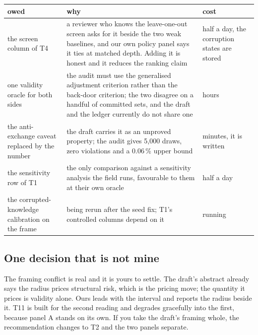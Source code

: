\begin{center}\footnotesize
\begin{tabular}{@{}p{5.0cm}p{8.4cm}p{2.5cm}@{}}
\toprule
owed & why & cost \\
\midrule
the screen column of T4 & a reviewer who knows the leave-one-out screen asks for it beside the two
weak baselines, and our own policy panel says it ties at matched depth. Adding it is honest and it
reduces the ranking claim & half a day, the corruption states are stored \\
\addlinespace
one validity oracle for both sides & the audit must use the generalised adjustment criterion rather
than the back-door criterion; the two disagree on a handful of committed sets, and the draft and
the ledger currently do not share one & hours \\
\addlinespace
the anti-exchange caveat replaced by the number & the draft carries it as an unproved property; the
audit gives 5{,}000 draws, zero violations and a 0.06\,\% upper bound & minutes, it is written \\
\addlinespace
the sensitivity row of T1 & the only comparison against a sensitivity analysis the field runs,
favourable to them at their own oracle & half a day \\
\addlinespace
the corrupted-knowledge calibration on the frame & being rerun after the seed fix; T1's controlled
columns depend on it & running \\
\bottomrule
\end{tabular}
\end{center}

\subsection{One decision that is not mine}

The framing conflict is real and it is yours to settle. The draft's abstract already says the
radius prices structural risk, which is the pricing move; the quantity it prices is validity alone.
Ours leads with the interval and reports the radius beside it. T11 is built for the second reading
and degrades gracefully into the first, because panel A stands on its own. If you take the draft's
framing whole, the recommendation changes to T2 and the two panels separate.
